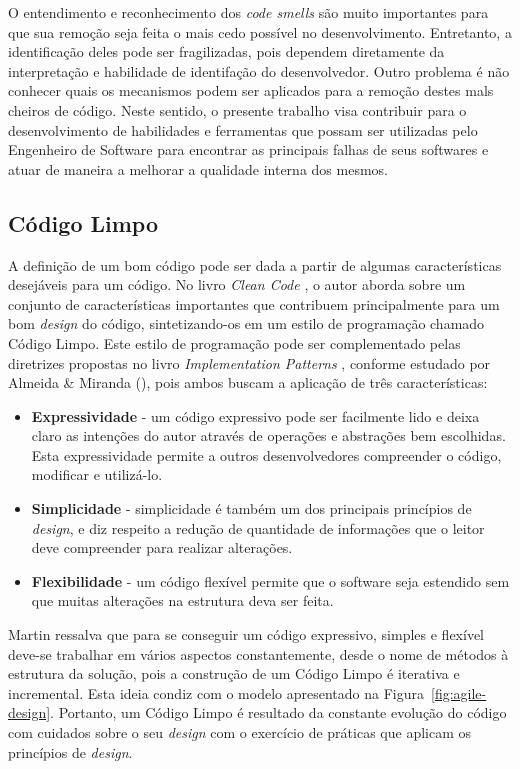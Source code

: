 O entendimento e reconhecimento dos \emph{code smells} são muito importantes para que sua remoção seja feita o mais cedo possível no desenvolvimento. Entretanto, a identificação deles pode ser fragilizadas, pois dependem diretamente da interpretação e habilidade de identifação do desenvolvedor. Outro problema é não conhecer quais os mecanismos podem ser aplicados para a remoção destes mals cheiros de código. Neste sentido, o presente trabalho visa contribuir para o desenvolvimento de habilidades e ferramentas que possam ser utilizadas pelo Engenheiro de Software para encontrar as principais falhas de seus softwares e atuar de maneira a melhorar a qualidade interna dos mesmos.

\subsection{Código Limpo}
\label{sec-clean-code}

A definição de um bom código pode ser dada a partir de algumas características desejáveis para um código. No livro \emph{Clean Code} \cite{martin2008}, o autor aborda sobre um conjunto de características importantes que contribuem principalmente para um bom \emph{design} do código, sintetizando-os em um estilo de programação chamado Código Limpo. Este estilo de programação pode ser complementado pelas diretrizes propostas no livro \emph{Implementation Patterns} \cite{beck2007}, conforme estudado por Almeida \& Miranda (\citeyear{almeida2010}), pois ambos buscam a aplicação de três características:

%

\begin{itemize}
\item \textbf{Expressividade} - um código expressivo pode ser facilmente lido e deixa claro as intenções do autor através de operações e abstrações bem escolhidas. Esta expressividade permite a outros desenvolvedores compreender o código, modificar e utilizá-lo.
\item \textbf{Simplicidade} - simplicidade é também um dos principais princípios de \emph{design}, e diz respeito a redução de quantidade de informações que o leitor deve compreender para realizar alterações.
\item \textbf{Flexibilidade} - um código flexível permite que o software seja estendido sem que muitas alterações na estrutura deva ser feita.
\end{itemize}

%

Martin ressalva que para se conseguir um código expressivo, simples e flexível deve-se trabalhar em vários aspectos constantemente, desde o nome de métodos à estrutura da solução, pois a construção de um Código Limpo é iterativa e incremental. Esta ideia condiz com o modelo apresentado na Figura~\ref{fig:agile-design}. Portanto, um Código Limpo é resultado da constante evolução do código com cuidados sobre o seu \emph{design} com o exercício de práticas que aplicam os princípios de \emph{design}. 

